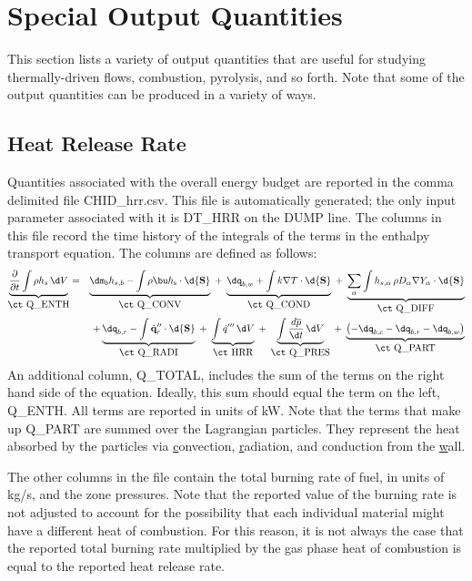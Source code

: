 \documentclass[11pt]{book}
\begin{document}
\section{Special Output Quantities}

This section lists a variety of output quantities that are useful for studying thermally-driven flows, combustion, pyrolysis, and so forth. Note that some of the output quantities can be produced in a variety of ways.


\subsection{Heat Release Rate}
\label{info:HRR}

Quantities associated with the overall energy budget are reported in the comma delimited file {\ct CHID\_hrr.csv}.  This file is automatically generated; the only input parameter associated with it is {\ct DT\_HRR} on the {\ct DUMP} line. The columns in this file record the time history of the integrals of the terms in the enthalpy transport equation. The columns are defined as follows:
\begin{eqnarray}
\label{eqn_enthalpytransport}
\underbrace{\frac{\partial}{\partial t} \int \rho h_s \, \d V }_{\hbox{\ct Q\_ENTH}} &=&
\underbrace{\dm_b h_{s,b} - \int \rho \bu h_{\rm s} \cdot \d {\bf S}}_{\hbox{\ct Q\_CONV}}
\; + \; \underbrace{\dq_{b,w} + \int k \nabla T \cdot \d {\bf S}}_{\hbox{\ct Q\_COND}}
\; + \; \underbrace{\sum_\alpha \int h_{s,\alpha} \, \rho D_\alpha \nabla Y_\alpha \cdot \d {\bf S}}_{\hbox{\ct Q\_DIFF}}  \nonumber \\
&&
+\underbrace{\dq_{b,r} - \int \dot{\mathbf{q}}^{\prime\prime}_{r} \cdot \d {\bf S}}_{\hbox{\ct Q\_RADI}}
\; + \; \underbrace{\int \dot{q}''' \, \d V}_{\hbox{\ct HRR}}
\; + \; \underbrace{\int \frac{d \overline{p} }{\d t} \, \d V}_{\hbox{\ct Q\_PRES}}
\; + \; \underbrace{\left( -\dq_{b,c} - \dq_{b,r} - \dq_{b,w} \right) }_{\hbox{\ct Q\_PART}}
\end{eqnarray}
An additional column, {\ct Q\_TOTAL}, includes the sum of the terms on the right hand side of the equation. Ideally, this sum should equal the term on the left, {\ct Q\_ENTH}. All terms are reported in units of kW. Note that the terms that make up {\ct Q\_PART} are summed over the Lagrangian particles. They represent the heat absorbed by the particles via \underline{c}onvection, \underline{r}adiation, and conduction from the \underline{w}all.

The other columns in the file contain the total burning rate of fuel, in units of kg/s, and the zone pressures. Note that the reported value of the burning rate is not adjusted to account for the possibility that each individual
material might have a different heat of combustion. For this reason, it is not always the case that the reported total burning rate multiplied by the gas phase heat of combustion is equal to the reported heat release rate.
\end{document}
